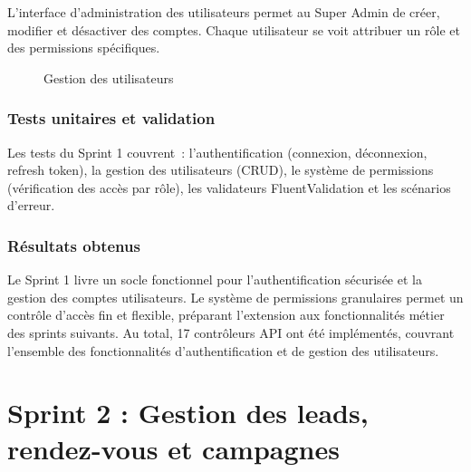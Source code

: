 L'interface d'administration des utilisateurs permet au Super Admin de créer, modifier et
désactiver des comptes. Chaque utilisateur se voit attribuer un rôle et des permissions
spécifiques.

\begin{figure}[H]
    \centering
    \caption{Gestion des utilisateurs}
    \label{fig:sprint1_users}
\end{figure}

\subsubsection{Tests unitaires et validation}

Les tests du Sprint 1 couvrent~: l'authentification (connexion, déconnexion, refresh token),
la gestion des utilisateurs (CRUD), le système de permissions (vérification des accès par
rôle), les validateurs FluentValidation et les scénarios d'erreur.

\subsubsection{Résultats obtenus}

Le Sprint 1 livre un socle fonctionnel pour l'authentification sécurisée et la gestion des
comptes utilisateurs. Le système de permissions granulaires permet un contrôle d'accès fin
et flexible, préparant l'extension aux fonctionnalités métier des sprints suivants. Au total,
17 contrôleurs API ont été implémentés, couvrant l'ensemble des fonctionnalités d'authentification
et de gestion des utilisateurs.

\section[Sprint 2 : Leads et rendez-vous]{Sprint 2 : Gestion des leads, rendez-vous et campagnes}
\label{sec:sprint2}

